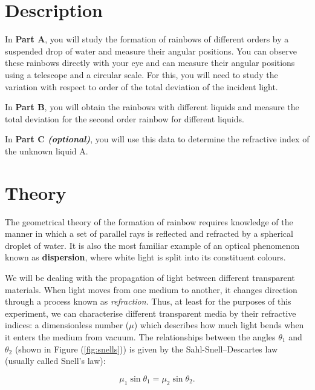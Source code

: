 \section*{Description}
In \textbf{Part A}, you will study the formation of rainbows of different orders by a suspended drop of water and measure their angular positions. You can observe these rainbows directly with your eye and can measure their angular positions using a telescope and a circular scale. For this, you will need to study the variation with respect to order of the total deviation of the incident light.

In \textbf{Part B}, you will obtain the rainbows with different liquids and measure the total deviation for the second order rainbow for different liquids.

In \textbf{Part C \textit{(optional)}}, you will use this data to determine the refractive index of the unknown liquid A. 


\section*{Theory}
The geometrical theory of the formation of rainbow requires knowledge of the manner in which a set of parallel rays is reflected and refracted by a spherical droplet of water. It is also the most familiar example of an optical phenomenon known as \textbf{dispersion}, where white light is split into its constituent colours. 

We will be dealing with the propagation of light between different transparent materials. When light moves from one medium to another, it changes direction through a process known as \textit{refraction}. Thus, at least for the purposes of this experiment, we can characterise different transparent media by their refractive indices: a dimensionless number ($\mu$) which describes how much light bends when it enters the medium from vacuum. The relationships between the angles $\theta_1$ and $\theta_2$ (shown in Figure (\ref{fig:snells})) is given by the Sahl-Snell–Descartes law (usually called Snell's law):

 \begin{equation}
    \mu_1 \sin{\theta_1}= \mu_2 \sin{\theta_2}.
    \label{snell}
 \end{equation}

 

